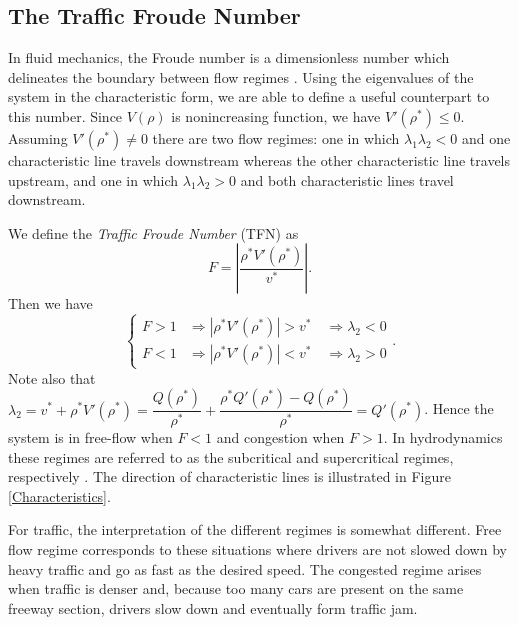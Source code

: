 \documentclass[preprint]{elsarticle}
\begin{document}
\subsection{The Traffic Froude Number}
In fluid mechanics, the Froude number is a dimensionless number which delineates the boundary between flow regimes \cite{Sturm, litrico2009modeling}. Using the eigenvalues of the system in the characteristic form, we are able to define a useful counterpart to this number.
Since $V(\rho)$ is nonincreasing function, we have $V'(\rho^*) \leq 0$. Assuming $V'(\rho^*) \neq 0$ there are two flow regimes: one in which $\lambda_1 \lambda_2 < 0$ and one characteristic line travels downstream whereas the other characteristic line travels upstream, and one in which $\lambda_1 \lambda_2 > 0$ and both characteristic lines travel downstream.

We define the \textit{Traffic Froude Number} (TFN) as
\begin{equation}
F = \left\lvert\dfrac{\rho^*V'( \rho^*)}{v^*}\right\rvert.
\end{equation} 
Then we have
\begin{equation*}
\begin{cases}
F > 1 &\Rightarrow |\rho^*V'(\rho^*)| > v^* \quad \Rightarrow \lambda_2  <0 \\
F < 1 &\Rightarrow |\rho^*V'(\rho^*)| < v^* \quad \Rightarrow \lambda_2 > 0
\end{cases}.
\end{equation*}
Note also that $\lambda_2 = v^* + \rho^* V'( \rho^*) = \dfrac{Q(\rho^*)}{\rho^*} + \dfrac{\rho^*Q'(\rho^*)-Q(\rho^*)}{\rho^*} = Q'(\rho^*)$. Hence the system is in free-flow when $F<1$ and congestion when $F>1$. In hydrodynamics these regimes are referred to as the subcritical and supercritical regimes, respectively \cite{litrico2009modeling}. The direction of characteristic lines is illustrated in Figure \ref{Characteristics}.

For traffic, the interpretation of the different regimes is somewhat different. Free flow regime corresponds to these situations where drivers are not slowed down by heavy traffic and go as fast as the desired speed. The congested regime arises when traffic is denser and, because too many cars are present on the same freeway section, drivers slow down and eventually form traffic jam.
\end{document}
